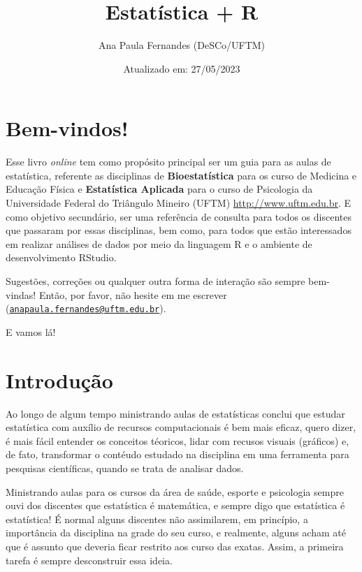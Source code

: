 \documentclass[
]{book}
\title{Estatística + R}
\author{Ana Paula Fernandes (DeSCo/UFTM)}
\date{Atualizado em: 27/05/2023}
\begin{document}
\maketitle

{
\setcounter{tocdepth}{1}
\tableofcontents
}
\hypertarget{bem-vindos}{%
\chapter{Bem-vindos!}\label{bem-vindos}}

Esse livro \emph{online} tem como propósito principal ser um guia para as aulas de estatística, referente as disciplinas de \textbf{Bioestatística} para os curso de Medicina e Educação Física e \textbf{Estatística Aplicada} para o curso de Psicologia da Universidade Federal do Triângulo Mineiro (UFTM) \url{http://www.uftm.edu.br}. E como objetivo secundário, ser uma referência de consulta para todos os discentes que passaram por essas disciplinas, bem como, para todos que estão interessados em realizar análises de dados por meio da linguagem R e o ambiente de desenvolvimento RStudio.

Sugestões, correções ou qualquer outra forma de interação são sempre bem-vindas! Então, por favor, não hesite em me escrever (\href{mailto:anapaula.fernandes@uftm.edu.br}{\nolinkurl{anapaula.fernandes@uftm.edu.br}}).

E vamos lá!

\hypertarget{intro}{%
\chapter{Introdução}\label{intro}}

Ao longo de algum tempo ministrando aulas de estatísticas conclui que estudar estatística com auxílio de recursos computacionais é bem mais eficaz, quero dizer, é mais fácil entender os conceitos téoricos, lidar com recusos visuais (gráficos) e, de fato, transformar o contéudo estudado na disciplina em uma ferramenta para pesquisas científicas, quando se trata de analisar dados.

Ministrando aulas para os cursos da área de saúde, esporte e psicologia sempre ouvi dos discentes que estatística é matemática, e sempre digo que estatística é estatística! É normal alguns discentes não assimilarem, em princípio, a importância da disciplina na grade do seu curso, e realmente, alguns acham até que é assunto que deveria ficar restrito aos curso das exatas. Assim, a primeira tarefa é sempre desconstruir essa ideia.
\end{document}
